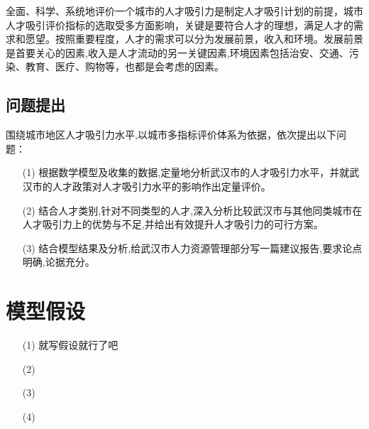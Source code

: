 \documentclass{whutmod}
\begin{document}
全面、科学、系统地评价一个城市的人才吸引力是制定人才吸引计划的前提，城市人才吸引评价指标的选取受多方面影响，关键是要符合人才的理想，满足人才的需求和愿望。按照重要程度，人才的需求可以分为发展前景，收入和环境。发展前景是首要关心的因素,收入是人才流动的另一关键因素,环境因素包括治安、交通、污染、教育、医疗、购物等，也都是会考虑的因素。




	
	\subsection{问题提出}
围绕城市地区人才吸引力水平,以城市多指标评价体系为依据，依次提出以下问题：
		 
	\begin{itemize}
	\item [(1)] 根据数学模型及收集的数据,定量地分析武汉市的人才吸引力水平，并就武汉市的人才政策对人才吸引力水平的影响作出定量评价。
	\item [(2)] 结合人才类别,针对不同类型的人才,深入分析比较武汉市与其他同类城市在人才吸引力上的优势与不足,并给出有效提升人才吸引力的可行方案。
	\item [(3)] 结合模型结果及分析,给武汉市人力资源管理部分写一篇建议报告,要求论点明确,论据充分。
	\end{itemize}
	
	\section{模型假设}
	\begin{itemize}
		\item [(1)] 就写假设就行了吧
		\item [(2)] 
		\item [(3)]
		\item [(4)]
	\end{itemize}
	
	
\end{document}
